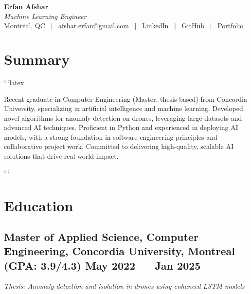 \documentclass[a4,10pt]{article}
\begin{document}

\begin{center}
    {\Huge \textbf{Erfan Afshar}} \\[0.15cm]
    {\color{UI_blue} \large \textit{Machine Learning Engineer}} \\[0.1cm]
    
    \large
    Montreal, QC \, | \,
    \href{mailto:afshar.erfan@gmail.com}{afshar.erfan@gmail.com} \, | \,
    \href{https://www.linkedin.com/in/erfan-afshar}{LinkedIn} \, | \,
    \href{https://github.com/Erfanafshar}{GitHub} \, | \,
    \href{https://erfanafshar.github.io}{Portfolio} 
\end{center}



\section{Summary}
```latex
\noindent
\begin{minipage}{\textwidth}
Recent graduate in Computer Engineering (Master, thesis-based) from Concordia University, specializing in artificial intelligence and machine learning. Developed novel algorithms for anomaly detection on drones, leveraging large datasets and advanced AI techniques. Proficient in Python and experienced in deploying AI models, with a strong foundation in software engineering principles and collaborative project work. Committed to delivering high-quality, scalable AI solutions that drive real-world impact.
\end{minipage}
```
\section{Education}
\subsection*{Master of Applied Science, Computer Engineering, {\normalsize \normalfont Concordia University, Montreal (GPA: 3.9/4.3)} \hfill May 2022 --- Jan 2025} 
\textit{Thesis: Anomaly detection and isolation in drones using enhanced LSTM models}
\end{document}
